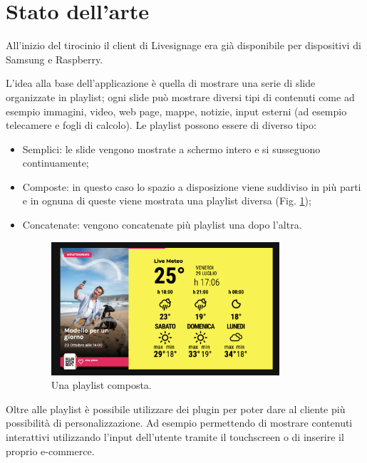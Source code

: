 \section{Stato dell'arte}\label{statoarte}

All'inizio del tirocinio il client di Livesignage era già disponibile per dispositivi di Samsung e Raspberry.  

L'idea alla base dell'applicazione è quella di mostrare una serie di slide organizzate in playlist; ogni slide può mostrare diversi tipi di contenuti come ad esempio immagini, video, web page, mappe, notizie, input esterni (ad esempio telecamere e fogli di calcolo). Le playlist possono essere di diverso tipo:

\begin{itemize}
    \item Semplici: le slide vengono mostrate a schermo intero e si susseguono continuamente;
    \item Composte: in questo caso lo spazio a disposizione viene suddiviso in più parti e in ognuna di queste viene mostrata una playlist diversa (Fig. \ref*{fig:playlist-composta});
    \item Concatenate: vengono concatenate più playlist una dopo l'altra.
    \begin{figure}[!htb]
        \centering
        \includegraphics[width= 0.8\textwidth]{images/Introduzione/playlist-composta.png} 
        \caption{Una playlist composta.} 
        \label{fig:playlist-composta}
    \end{figure}
\end{itemize}


Oltre alle playlist è possibile utilizzare dei plugin per poter dare al cliente più possibilità di personalizzazione. Ad esempio permettendo di  mostrare contenuti interattivi utilizzando l'input dell'utente tramite il touchscreen o di inserire il proprio e-commerce.

